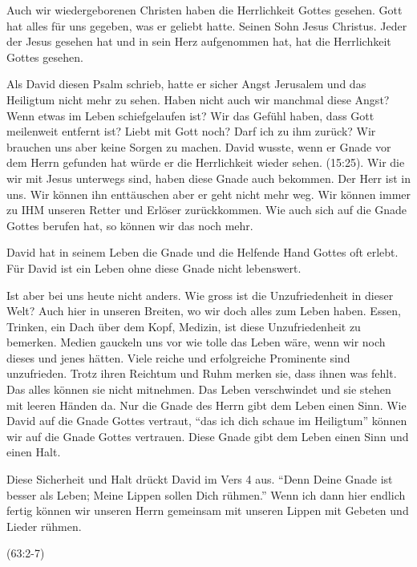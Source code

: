 \documentclass[14pt]{../../inc/mybib}
\begin{document}
    \begin{block}
        Auch wir wiedergeborenen Christen haben die Herrlichkeit Gottes gesehen. Gott hat alles für uns gegeben, was er geliebt hatte. Seinen Sohn Jesus Christus. Jeder der Jesus gesehen hat und in sein Herz aufgenommen hat, hat die Herrlichkeit Gottes gesehen. 
    \end{block}
    \begin{block}
        Als David diesen Psalm schrieb, hatte er sicher Angst Jerusalem und das Heiligtum nicht mehr zu sehen. Haben nicht auch wir manchmal diese Angst? Wenn etwas im Leben schiefgelaufen ist? Wir das Gefühl haben, dass Gott meilenweit entfernt ist? Liebt mit Gott noch? Darf ich zu ihm zurück? Wir brauchen uns aber keine Sorgen zu machen. David wusste, wenn er Gnade vor dem Herrn gefunden hat würde er die Herrlichkeit wieder sehen. (15:25). Wir die wir mit Jesus unterwegs sind, haben diese Gnade auch bekommen. Der Herr ist in uns. Wir können ihn enttäuschen aber er geht nicht mehr weg. Wir können immer zu IHM unseren Retter und Erlöser zurückkommen. Wie auch sich auf die Gnade Gottes berufen hat, so können wir das noch mehr.
    \end{block}
    \begin{block}
        David hat in seinem Leben die Gnade und die Helfende Hand Gottes oft erlebt. Für David ist ein Leben ohne diese Gnade nicht lebenswert. 

        Ist aber bei uns heute nicht anders. Wie gross ist die Unzufriedenheit in dieser Welt? Auch hier in unseren Breiten, wo wir doch alles zum Leben haben. Essen, Trinken, ein Dach über dem Kopf, Medizin, ist diese Unzufriedenheit zu bemerken. Medien gauckeln uns vor wie tolle das Leben wäre, wenn wir noch dieses und jenes hätten. Viele reiche und erfolgreiche Prominente sind unzufrieden. Trotz ihren Reichtum und Ruhm merken sie, dass ihnen was fehlt. Das alles können sie nicht mitnehmen. Das Leben verschwindet und sie stehen mit leeren Händen da. Nur die Gnade des Herrn gibt dem Leben einen Sinn. Wie David auf die Gnade Gottes vertraut, \enquote{das ich dich schaue im Heiligtum} können wir auf die Gnade Gottes vertrauen. Diese Gnade gibt dem Leben einen Sinn und einen Halt.
    \end{block}
    \begin{block}
        Diese Sicherheit und Halt drückt David im Vers 4 aus. \enquote{Denn Deine Gnade ist besser als Leben; Meine Lippen sollen Dich rühmen.}
        Wenn ich dann hier endlich fertig können wir unseren Herrn gemeinsam mit unseren Lippen mit Gebeten und Lieder rühmen.
    \end{block}
    (63:2-7)
\end{document}
